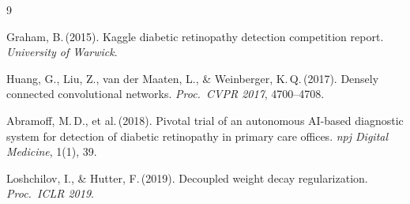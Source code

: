 \documentclass[a4paper, 10pt, twocolumn]{article}
\begin{document}
\vspace{10pt}

\renewcommand{\refname}{\normalfont\bfseries\small\color{accent}References}
\begin{thebibliography}{9}
\small\setlength{\itemsep}{1pt}

Graham, B.\,(2015).
Kaggle diabetic retinopathy detection competition report.
\textit{University of Warwick}.

Huang, G., Liu, Z., van der Maaten, L., \& Weinberger, K.\,Q.\,(2017).
Densely connected convolutional networks.
\textit{Proc.\ CVPR 2017}, 4700--4708.

Abramoff, M.\,D., et al.\,(2018).
Pivotal trial of an autonomous AI-based diagnostic system for detection of
diabetic retinopathy in primary care offices.
\textit{npj Digital Medicine}, 1(1), 39.

Loshchilov, I., \& Hutter, F.\,(2019).
Decoupled weight decay regularization.
\textit{Proc.\ ICLR 2019}.

\end{thebibliography}
\end{document}
